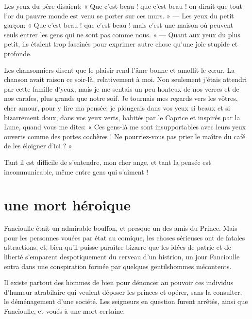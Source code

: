 Les yeux du père disaient: « Que c’est beau ! que
c’est beau ! on dirait que tout l’or
du pauvre monde est venu se porter sur ces murs. » --- Les yeux du petit
garçon: « Que c’est beau ! que c’est
beau ! mais c’est une maison où peuvent seuls entrer
les gens qui ne sont pas comme nous. » --- Quant aux yeux du plus petit, 
ils étaient trop fascinés pour exprimer autre chose 
qu’une joie stupide et profonde.

Les chansonniers disent que le plaisir rend l’âme bonne
et amollit le c\oe ur. La chanson avait raison ce soir{}-là, relativement
à moi. Non seulement j’étais attendri par cette
famille d’yeux, mais je me sentais un peu honteux de
nos verres et de nos carafes, plus grands que notre soif. Je tournais
mes regards vers les vôtres, cher amour, pour y lire ma pensée; je
plongeais dans vos yeux si beaux et si bizarrement doux, dans vos yeux
verts, habités par le Caprice et inspirés par la Lune, quand vous me
dites: « Ces gens{}-là me sont insupportables avec leurs yeux ouverts
comme des portes cochères ! Ne pourriez{}-vous pas prier le maître du
café de les éloigner d’ici ? »

Tant il est difficile de s’entendre, mon cher ange, et
tant la pensée est incommunicable, même entre gens qui
s’aiment !

\quebra\section[Une mort héroique]{une mort héroique }

Fancioulle était un admirable bouffon, et presque un des amis du Prince.
Mais pour les personnes vouées par état au comique, les choses
sérieuses ont de fatales attractions, et, bien qu’il
puisse paraître bizarre que les idées de patrie et de liberté
s’emparent despotiquement du cerveau
d’un histrion, un jour Fancioulle entra dans une
conspiration formée par quelques gentilshommes mécontents.

Il existe partout des hommes de bien pour dénoncer au pouvoir ces
individus d’humeur atrabilaire qui veulent déposer les
princes et opérer, sans la consulter, le déménagement
d’une société. Les seigneurs en question furent
arrêtés, ainsi que Fancioulle, et voués à une mort certaine.

